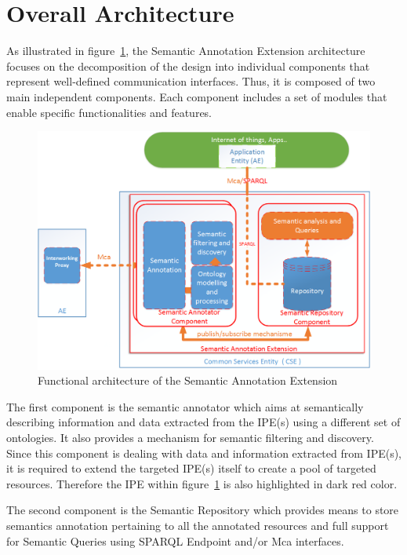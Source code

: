 \section{Overall Architecture}

As illustrated in figure~\ref{fig:contrib2:2}, the Semantic Annotation Extension architecture focuses on the decomposition of the design into individual components that represent well-defined communication interfaces. Thus, it is composed of two main independent components. Each component includes a set of modules that enable specific functionalities and features. \par
\begin{figure}[htbp]
    \centering
    \includegraphics[width=1\textwidth]{resources/images/archi}
    \caption{Functional architecture of the Semantic Annotation Extension }\label{fig:contrib2:2}
\end{figure}
The first component is the semantic annotator which aims at semantically describing information and data extracted from the IPE(s) using a different set of ontologies. It also provides a mechanism for semantic filtering and discovery. Since this component is dealing with data and information extracted from IPE(s), it is required to extend the targeted IPE(s) itself to create a pool of targeted resources. Therefore the IPE within figure~\ref{fig:contrib2:2} is also highlighted in dark red color.\par
The second component is the Semantic Repository which provides means to store semantics annotation pertaining to all the annotated resources and full support for Semantic Queries using SPARQL Endpoint and/or Mca interfaces. \par 
